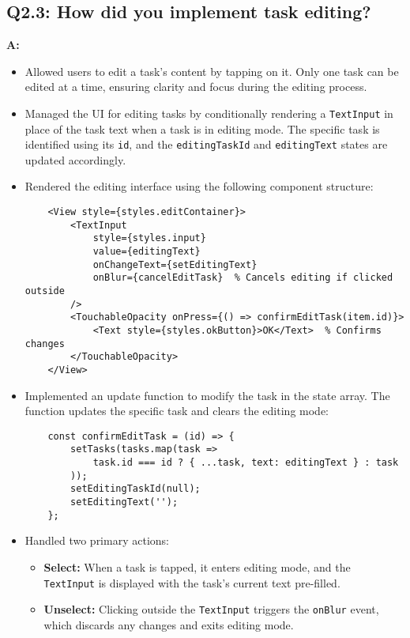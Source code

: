 \documentclass{article}
\begin{document}
\subsection*{Q2.3: How did you implement task editing?}
\textbf{A:}
\begin{itemize}
    \item Allowed users to edit a task's content by tapping on it. Only one task can be edited at a time, ensuring clarity and focus during the editing process.

    \item Managed the UI for editing tasks by conditionally rendering a \texttt{TextInput} in place of the task text when a task is in editing mode. The specific task is identified using its \texttt{id}, and the \texttt{editingTaskId} and \texttt{editingText} states are updated accordingly.

    \item Rendered the editing interface using the following component structure:
    \begin{verbatim}
    <View style={styles.editContainer}>
        <TextInput
            style={styles.input}
            value={editingText}
            onChangeText={setEditingText}
            onBlur={cancelEditTask}  % Cancels editing if clicked outside
        />
        <TouchableOpacity onPress={() => confirmEditTask(item.id)}>
            <Text style={styles.okButton}>OK</Text>  % Confirms changes
        </TouchableOpacity>
    </View>
    \end{verbatim}

    \item Implemented an update function to modify the task in the state array. The function updates the specific task and clears the editing mode:
    \begin{verbatim}
    const confirmEditTask = (id) => {
        setTasks(tasks.map(task =>
            task.id === id ? { ...task, text: editingText } : task
        ));
        setEditingTaskId(null);
        setEditingText('');
    };
    \end{verbatim}

    \item Handled two primary actions:
    \begin{itemize}
        \item \textbf{Select:} When a task is tapped, it enters editing mode, and the \texttt{TextInput} is displayed with the task's current text pre-filled.
        \item \textbf{Unselect:} Clicking outside the \texttt{TextInput} triggers the \texttt{onBlur} event, which discards any changes and exits editing mode.
    \end{itemize}


\end{itemize}
\end{document}
